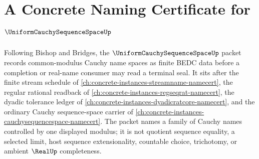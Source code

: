 \chapter{A Concrete Naming Certificate for $\UniformCauchySequenceSpaceUp$}
\label{ch:concrete-instances-uniform-cauchy-sequence-space-namecert}

Following Bishop and Bridges, the $\UniformCauchySequenceSpaceUp$ packet records common-modulus Cauchy name spaces as finite BEDC data before a completion or real-name consumer may read a terminal seal. It sits after the finite stream schedule of \autoref{ch:concrete-instances-streamname-namecert}, the regular rational readback of \autoref{ch:concrete-instances-regseqrat-namecert}, the dyadic tolerance ledger of \autoref{ch:concrete-instances-dyadicratcore-namecert}, and the ordinary Cauchy sequence-space carrier of \autoref{ch:concrete-instances-cauchysequencespace-namecert}. The packet names a family of Cauchy names controlled by one displayed modulus; it is not quotient sequence equality, a selected limit, host sequence extensionality, countable choice, trichotomy, or ambient $\RealUp$ completeness.

